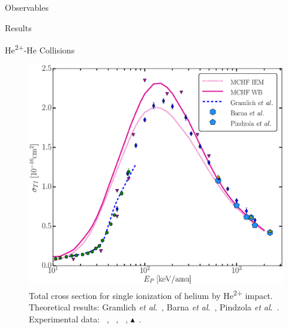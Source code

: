 \documentclass[letterpaper, 11 pt]{report}
\begin{document}
\begin{chapter}{Observables \label{chap:p-he2p-he}}
\begin{section}{Results \label{sec:phe2p-res}}
\begin{subsection}{\texorpdfstring{He\textsuperscript{2+}}{He2+}-He Collisions 
                         \label{sec:he2phe-res}}
\begin{figure}[ht]
\begin{minipage}{.49\linewidth}
               \centering
               \includegraphics[width = \linewidth]{./images/he2phe/he2phe-TI.eps}
               \caption[Total cross section for single ionization of helium by He\textsuperscript{2+}
                        impact.]{Total cross section for single ionization of helium by
                        He\textsuperscript{2+} impact. Theoretical results: Gramlich
                        \textit{et al}.~\cite{GGS-89}, Barna
                        \textit{et al}.~\cite{BTB-05}, Pindzola \textit{et al}.~\cite{PRC-07}.
                        Experimental data: {\color{blue}{$\blacklozenge$}}~\cite{SG85},
                        {\color{OliveGreen}{$\bullet$}}~\cite{SG89},
                        {\color{RedViolet}{$\blacktriangledown$}}~\cite{Dubois87},
                        {\color{GreenYellow}$\blacktriangle$}~\cite{KAH84}. \label{fig:he2phe-ti}}
            \end{minipage} \hspace{0.04\linewidth} %
            \begin{minipage}{.49\linewidth}


\end{minipage}
\end{figure}
\end{subsection}
\end{section}
\end{chapter}
\end{document}

